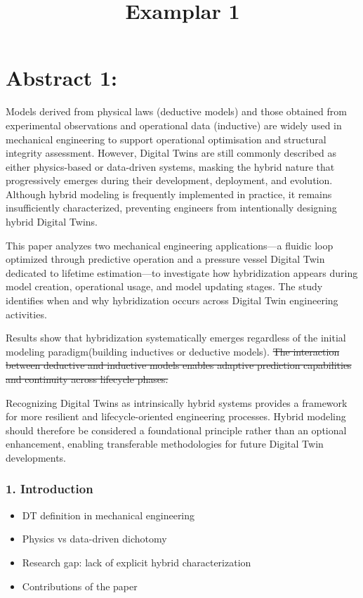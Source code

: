 \documentclass[
]{article}
\title{Examplar 1}
\author{}
\date{}
\providecommand{\tightlist}{%
  \setlength{\itemsep}{0pt}\setlength{\parskip}{0pt}}
\begin{document}
\maketitle

\section{Abstract 1:}\label{abstract-1}

Models derived from physical laws (deductive models) and those obtained
from experimental observations and operational data (inductive) are
widely used in mechanical engineering to support operational
optimisation and structural integrity assessment. However, Digital Twins
are still commonly described as either physics-based or data-driven
systems, masking the hybrid nature that progressively emerges during
their development, deployment, and evolution. Although hybrid modeling
is frequently implemented in practice, it remains insufficiently
characterized, preventing engineers from intentionally designing hybrid
Digital Twins.

This paper analyzes two mechanical engineering applications---a fluidic
loop optimized through predictive operation and a pressure vessel
Digital Twin dedicated to lifetime estimation---to investigate how
hybridization appears during model creation, operational usage, and
model updating stages. The study identifies when and why hybridization
occurs across Digital Twin engineering activities.

Results show that hybridization systematically emerges regardless of the
initial modeling paradigm(building inductives or deductive models).
\st{The interaction between deductive and inductive models enables
adaptive prediction capabilities and continuity across lifecycle
phases.}

Recognizing Digital Twins as intrinsically hybrid systems provides a
framework for more resilient and lifecycle-oriented engineering
processes. Hybrid modeling should therefore be considered a foundational
principle rather than an optional enhancement, enabling transferable
methodologies for future Digital Twin developments.

\subsubsection{1. Introduction}\label{introduction}

\begin{itemize}
\tightlist
\item
  DT definition in mechanical engineering
\item
  Physics vs data-driven dichotomy
\item
  Research gap: lack of explicit hybrid characterization
\item
  Contributions of the paper
\end{itemize}
\end{document}
